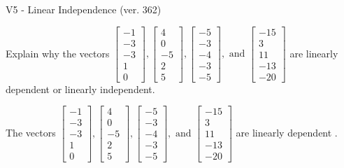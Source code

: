 \begin{exercise}
  \begin{exerciseTitle}V5 - Linear Independence (ver. 362)\end{exerciseTitle}
  \begin{exerciseStatement}
    Explain why the vectors \(\left[\begin{array}{r}
-1 \\
-3 \\
-3 \\
1 \\
0
\end{array}\right] , \left[\begin{array}{r}
4 \\
0 \\
-5 \\
2 \\
5
\end{array}\right] , \left[\begin{array}{r}
-5 \\
-3 \\
-4 \\
-3 \\
-5
\end{array}\right] , \text{ and } \left[\begin{array}{r}
-15 \\
3 \\
11 \\
-13 \\
-20
\end{array}\right]\) are linearly dependent or linearly independent.	


  \end{exerciseStatement}
  \begin{exerciseAnswer}
   The vectors \(\left[\begin{array}{r}
-1 \\
-3 \\
-3 \\
1 \\
0
\end{array}\right] , \left[\begin{array}{r}
4 \\
0 \\
-5 \\
2 \\
5
\end{array}\right] , \left[\begin{array}{r}
-5 \\
-3 \\
-4 \\
-3 \\
-5
\end{array}\right] , \text{ and } \left[\begin{array}{r}
-15 \\
3 \\
11 \\
-13 \\
-20
\end{array}\right]\) are 
  	 linearly dependent  .
  


  \end{exerciseAnswer}
\end{exercise}